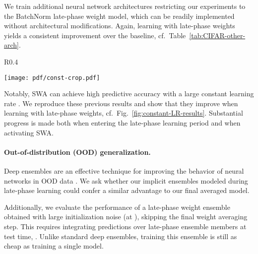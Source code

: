 \documentclass{article} \usepackage{iclr2021_conference,times}
\begin{document}
We train additional neural network architectures restricting our experiments to the BatchNorm late-phase weight model, which can be readily implemented without architectural modifications. Again, learning with late-phase weights yields a consistent improvement over the baseline, cf.~Table~\ref{tab:CIFAR-other-arch}. 

\begin{wrapfigure}[14]{R}{0.4\textwidth}
\begin{center}
    \texttt{[image: pdf/const-crop.pdf]}
  \end{center}
  \vspace{-10pt}
\end{wrapfigure}
Notably, SWA can achieve high predictive accuracy with a large constant learning rate  \citep{izmailov_averaging_2018}. We reproduce these previous results and show that they improve when learning with late-phase weights, cf.~Fig.~\ref{fig:constant-LR-results}. Substantial progress is made both when entering the late-phase learning period and when activating SWA.


\paragraph{Out-of-distribution (OOD) generalization.} Deep ensembles are an effective technique for improving the behavior of neural networks in OOD data \citep{lakshminarayanan_simple_2017}. We ask whether our implicit ensembles modeled during late-phase learning could confer a similar advantage to our final averaged model.

Additionally, we evaluate the performance of a late-phase weight ensemble obtained with large initialization noise  (at ), skipping the final weight averaging step. This requires integrating predictions over  late-phase ensemble members at test time, . Unlike standard deep ensembles, training this ensemble is still as cheap as training a single model.
\end{document}
